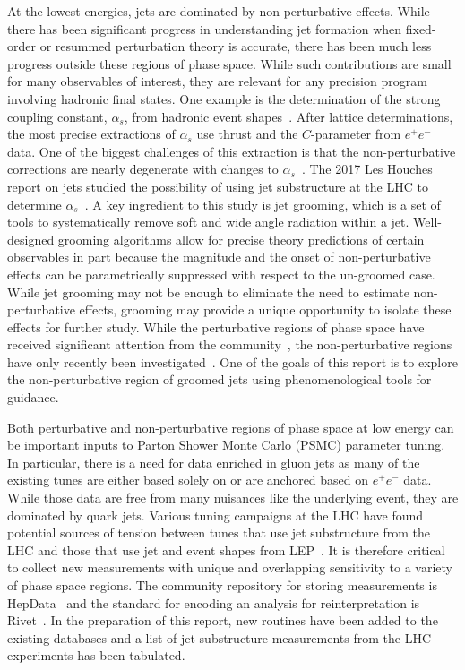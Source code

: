\documentclass[11pt]{cernrep}
\begin{document}
At the lowest energies, jets are dominated by non-perturbative effects.  While there has been significant progress in understanding jet formation when fixed-order or resummed perturbation theory is accurate, there has been much less progress outside these regions of phase space.  While such contributions are small for many observables of interest, they are relevant for any precision program involving hadronic final states.  One example is the determination of the strong coupling constant, $\alpha_s$, from hadronic event shapes~\cite{Abbate:2010xh,Hoang:2015hka,TheALEPHCollaboration2004,DELPHICollaboration1997,Abdallah:2004xe,Biebel:1999zt,Abbiendi:2004qz,Buskulic:1992hq}.   After lattice determinations, the most precise extractions of $\alpha_s$ use thrust and the $C$-parameter from $e^+e^-$ data.  One of the biggest challenges of this extraction is that the non-perturbative corrections are nearly degenerate with changes to $\alpha_s$~\cite{Abbate:2010xh}.  The 2017 Les Houches report on jets studied the possibility of using jet substructure at the LHC to determine $\alpha_s$~\cite{Bendavid:2018nar}.  A key ingredient to this study is jet grooming, which is a set of tools to systematically remove soft and wide angle radiation within a jet.  Well-designed grooming algorithms allow for precise theory predictions of certain observables in part because the magnitude and the onset of non-perturbative effects can be parametrically suppressed with respect to the un-groomed case.  While jet grooming may not be enough to eliminate the need to estimate non-perturbative effects, grooming may provide a unique opportunity to isolate these effects for further study.   While the perturbative regions of phase space have received significant attention from the community~\cite{Frye:2016aiz,Frye:2016okc,Marzani:2017mva,Marzani:2017kqd,Kang:2018vgn,Kang:2018jwa,Baron:2018nfz,Kardos:2018kth}, the non-perturbative regions have only recently been investigated~\cite{Hoang:2019ceu}.   One of the goals of this report is to explore the non-perturbative region of groomed jets using phenomenological tools for guidance. 

Both perturbative and non-perturbative regions of phase space at low energy can be important inputs to Parton Shower Monte Carlo (PSMC) parameter tuning.  In particular, there is a need for data enriched in gluon jets as many of the existing tunes are either based solely on or are anchored based on $e^+e^-$ data.  While those data are free from many nuisances like the underlying event, they are dominated by quark jets.  Various tuning campaigns at the LHC have found potential sources of tension between tunes that use jet substructure from the LHC and those that use jet and event shapes from LEP~\cite{ATL-PHYS-PUB-2014-021,Aad:2016oit}.  It is therefore critical to collect new measurements with unique and overlapping sensitivity to a variety of phase space regions.  The community repository for storing measurements is HepData~\cite{Buckley:2010jn,Maguire:2017ypu} and the standard for encoding an analysis for reinterpretation is Rivet~\cite{Buckley:2010ar}.  In the preparation of this report, new routines have been added to the existing databases and a list of jet substructure measurements from the LHC experiments has been tabulated.
\end{document}
